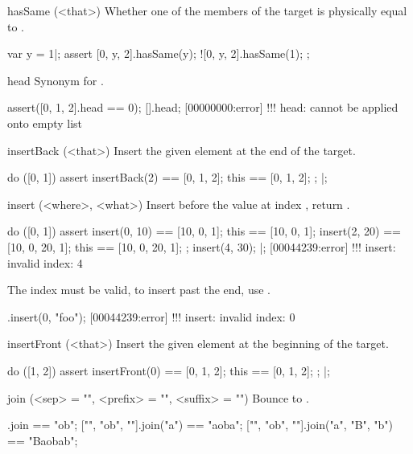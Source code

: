 \begin{urbiscriptapi}
\item[hasSame](<that>)
  Whether one of the members of the target is physically equal to
  .
\begin{urbiscript}
var y = 1|;
assert
{
   [0, y, 2].hasSame(y);
  ![0, y, 2].hasSame(1);
};
\end{urbiscript}

\item[head]
  Synonym for .
\begin{urbiscript}
assert([0, 1, 2].head == 0);
[].head;
[00000000:error] !!! head: cannot be applied onto empty list
\end{urbiscript}

\item[insertBack](<that>)
  Insert the given element at the end of the target.

\begin{urbiscript}
do ([0, 1])
{
  assert
  {
    insertBack(2) == [0, 1, 2];
    this          == [0, 1, 2];
  };
}|;
\end{urbiscript}

\item[insert](<where>, <what>)
  Insert  before the value at index , return
  \this.
\begin{urbiscript}
do ([0, 1])
{
  assert
  {
    insert(0, 10) == [10, 0, 1];
    this          == [10, 0, 1];
    insert(2, 20) == [10, 0, 20, 1];
    this          == [10, 0, 20, 1];
  };
  insert(4, 30);
}|;
[00044239:error] !!! insert: invalid index: 4
\end{urbiscript}

  The index must be valid, to insert past the end, use .
\begin{urbiscript}
[].insert(0, "foo");
[00044239:error] !!! insert: invalid index: 0
\end{urbiscript}


\item[insertFront](<that>)
  Insert the given element at the beginning of the target.

\begin{urbiscript}
do ([1, 2])
{
  assert
  {
    insertFront(0) == [0, 1, 2];
    this           == [0, 1, 2];
  };
}|;
\end{urbiscript}

\item[join](<sep> = "", <prefix> = "", <suffix> = "")
  Bounce to .

\begin{urbiassert}
["", "ob", ""].join                == "ob";
["", "ob", ""].join("a")           == "aoba";
["", "ob", ""].join("a", "B", "b") == "Baobab";
\end{urbiassert}


\end{urbiscriptapi}
